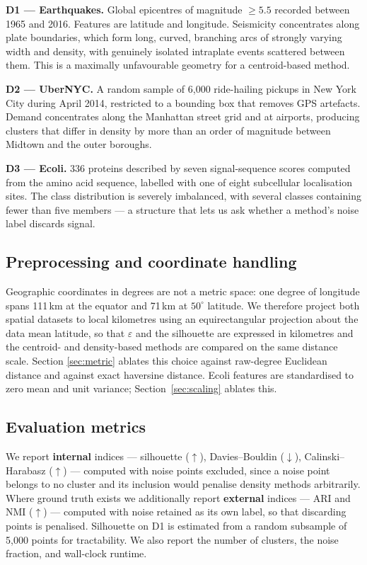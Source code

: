 \documentclass[11pt,a4paper]{article}
\begin{document}
\textbf{D1 --- Earthquakes.} Global epicentres of magnitude $\geq5.5$ recorded
between 1965 and 2016. Features are latitude and longitude. Seismicity
concentrates along plate boundaries, which form long, curved, branching arcs of
strongly varying width and density, with genuinely isolated intraplate events
scattered between them. This is a maximally unfavourable geometry for a
centroid-based method.

\textbf{D2 --- UberNYC.} A random sample of 6{,}000 ride-hailing pickups in New
York City during April 2014, restricted to a bounding box that removes GPS
artefacts. Demand concentrates along the Manhattan street grid and at airports,
producing clusters that differ in density by more than an order of magnitude
between Midtown and the outer boroughs.

\textbf{D3 --- Ecoli.} 336 proteins described by seven signal-sequence scores
computed from the amino acid sequence, labelled with one of eight subcellular
localisation sites. The class distribution is severely imbalanced, with several
classes containing fewer than five members --- a structure that lets us ask
whether a method's noise label discards signal.

\subsection{Preprocessing and coordinate handling}
Geographic coordinates in degrees are not a metric space: one degree of
longitude spans 111\,km at the equator and 71\,km at $50^\circ$ latitude.
We therefore project both spatial datasets to local kilometres using an
equirectangular projection about the data mean latitude, so that $\varepsilon$
and the silhouette are expressed in kilometres and the centroid- and
density-based methods are compared on the same distance scale. Section
\ref{sec:metric} ablates this choice against raw-degree Euclidean distance and
against exact haversine distance. Ecoli features are standardised to zero mean
and unit variance; Section~\ref{sec:scaling} ablates this.

\subsection{Evaluation metrics}
We report \textbf{internal} indices --- silhouette ($\uparrow$),
Davies--Bouldin ($\downarrow$), Calinski--Harabasz ($\uparrow$) --- computed with
noise points excluded, since a noise point belongs to no cluster and its
inclusion would penalise density methods arbitrarily. Where ground truth exists
we additionally report \textbf{external} indices --- ARI and NMI ($\uparrow$) ---
computed with noise retained as its own label, so that discarding points is
penalised. Silhouette on D1 is estimated from a random subsample of 5{,}000
points for tractability. We also report the number of clusters, the noise
fraction, and wall-clock runtime.
\end{document}
